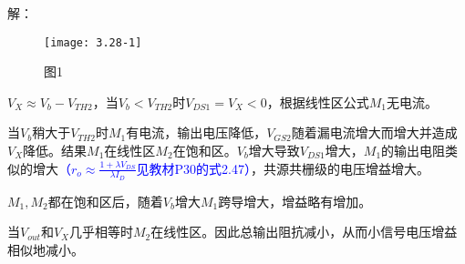 


解：

		\begin{figure}[H] %
	\begin{minipage}{\linewidth}
		\texttt{[image: 3.28-1]}
	\end{minipage}
	\caption*{图1} %
\end{figure}

$V_X \approx V_b-V_{TH2}$，当$V_b<V_{TH2}$时$V_{DS1}=V_X<0$，根据线性区公式$M_1$无电流。

当$V_b$稍大于$V_{TH2}$时$M_1$有电流，输出电压降低，$V_{GS2}$随着漏电流增大而增大并造成$V_X$降低。结果$M_1$在线性区$M_2$在饱和区。$V_b$增大导致$V_{DS1}$增大，$M_1$的输出电阻类似的增大\textcolor{blue}{（$r_o \approx \frac{1+ \lambda V_{DS}}{\lambda I_D}$见教材P30的式2.47）}，共源共栅级的电压增益增大。

$M_1,M_2$都在饱和区后，随着$V_b$增大$M_1$跨导增大，增益略有增加。

当$V_{out}$和$V_X$几乎相等时$M_2$在线性区。因此总输出阻抗减小，从而小信号电压增益相似地减小。






